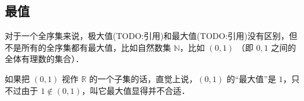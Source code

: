 

\subsection{最值}


对于一个全序集来说，极大值(TODO:引用)和最大值(TODO:引用)没有区别，但不是所有的全序集都有最大值，比如自然数集 $\mathbb{N}$，比如 $(0, 1)$ （即 $0, 1$ 之间的全体有理数的集合）．

如果把 $(0, 1)$ 视作 $\mathbb{R}$ 的一个子集的话，直觉上说，$(0, 1)$ 的“最大值”是 $1$，只不过由于 $1 \not\in (0, 1)$，叫它最大值显得并不合适．